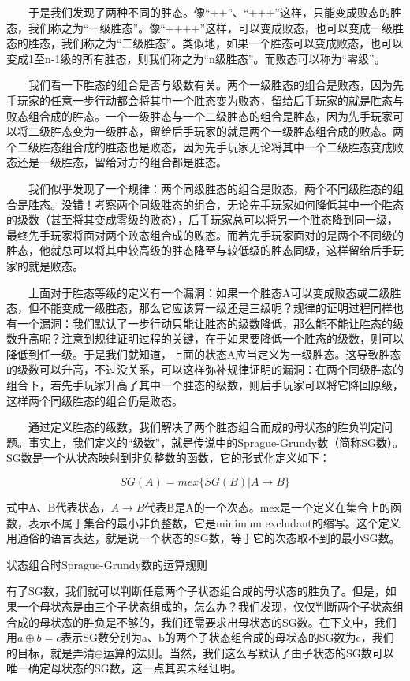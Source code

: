 　　于是我们发现了两种不同的胜态。像“++”、“+++”这样，只能变成败态的胜态，我们称之为“一级胜态”。像“++++”这样，可以变成败态，也可以变成一级胜态的胜态，我们称之为“二级胜态”。类似地，如果一个胜态可以变成败态，也可以变成1至n-1级的所有胜态，则我们称之为“n级胜态”。而败态可以称为“零级”。

　　我们看一下胜态的组合是否与级数有关。两个一级胜态的组合是败态，因为先手玩家的任意一步行动都会将其中一个胜态变为败态，留给后手玩家的就是胜态与败态组合成的胜态。一个一级胜态与一个二级胜态的组合是胜态，因为先手玩家可以将二级胜态变为一级胜态，留给后手玩家的就是两个一级胜态组合成的败态。两个二级胜态组合成的胜态也是败态，因为先手玩家无论将其中一个二级胜态变成败态还是一级胜态，留给对方的组合都是胜态。

　　我们似乎发现了一个规律：两个同级胜态的组合是败态，两个不同级胜态的组合是胜态。没错！考察两个同级胜态的组合，无论先手玩家如何降低其中一个胜态的级数（甚至将其变成零级的败态），后手玩家总可以将另一个胜态降到同一级，最终先手玩家将面对两个败态组合成的败态。而若先手玩家面对的是两个不同级的胜态，他就总可以将其中较高级的胜态降至与较低级的胜态同级，这样留给后手玩家的就是败态。

　　上面对于胜态等级的定义有一个漏洞：如果一个胜态A可以变成败态或二级胜态，但不能变成一级胜态，那么它应该算一级还是三级呢？规律的证明过程同样也有一个漏洞：我们默认了一步行动只能让胜态的级数降低，那么能不能让胜态的级数升高呢？注意到规律证明过程的关键，在于如果要降低一个胜态的级数，则可以降低到任一级。于是我们就知道，上面的状态A应当定义为一级胜态。这导致胜态的级数可以升高，不过没关系，可以这样弥补规律证明的漏洞：在两个同级胜态的组合下，若先手玩家升高了其中一个胜态的级数，则后手玩家可以将它降回原级，这样两个同级胜态的组合仍是败态。

　　通过定义胜态的级数，我们解决了两个胜态组合而成的母状态的胜负判定问题。事实上，我们定义的“级数”，就是传说中的Sprague-Grundy数（简称SG数）。SG数是一个从状态映射到非负整数的函数，它的形式化定义如下：

$$
SG(A) = mex\{ SG(B)| A \to B\}
$$

式中A、B代表状态，$A \to B$代表B是A的一个次态。mex是一个定义在集合上的函数，表示不属于集合的最小非负整数，它是minimum excludant的缩写。这个定义用通俗的语言表达，就是说一个状态的SG数，等于它的次态取不到的最小SG数。

状态组合时Sprague-Grundy数的运算规则

有了SG数，我们就可以判断任意两个子状态组合成的母状态的胜负了。但是，如果一个母状态是由三个子状态组成的，怎么办？我们发现，仅仅判断两个子状态组合成的母状态的胜负是不够的，我们还需要求出母状态的SG数。在下文中，我们用$a \oplus b = c$表示SG数分别为a、b的两个子状态组合成的母状态的SG数为c，我们的目标，就是弄清$\oplus$运算的法则。当然，我们这么写默认了由子状态的SG数可以唯一确定母状态的SG数，这一点其实未经证明。

